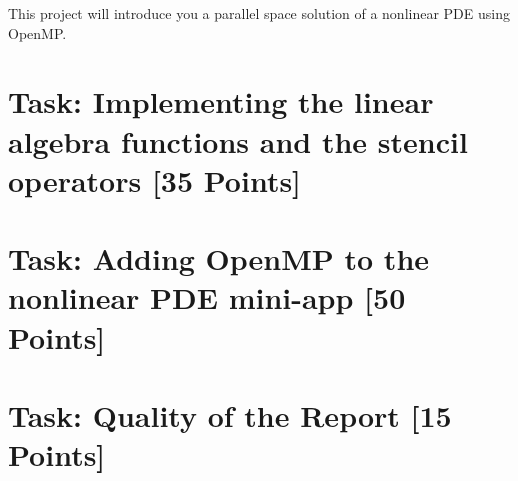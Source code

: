 \documentclass[unicode,11pt,a4paper,oneside,numbers=endperiod,openany]{scrartcl}
\begin{document}
\setassignment

\newline

\assignmentpolicy
This project will introduce you a parallel space solution of a nonlinear PDE using OpenMP.


\section{Task: Implementing the linear algebra functions and the stencil operators [35 Points]}


\section{Task:  Adding OpenMP to the nonlinear PDE mini-app [50 Points]}



\section{Task:  Quality of the Report   [15 Points]}
\end{document}
